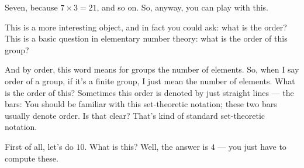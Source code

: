 \begin{speech}[00:08:44 - 00:09:45]
Seven, because $7 \times 3 = 21$, and so on. So, anyway, you can play with this.

This is a more interesting object, and in fact you could ask: what is the order? This is a basic question in elementary number theory: what is the order of this group? 

And by order, this word means for groups the number of elements.  So, when I say order of a group, if it's a finite group, I just mean the number of elements. What is the order of this? Sometimes this order is denoted by just straight lines --- the bars:  You should be familiar with this set-theoretic notation; these two bars usually denote order. Is that clear? That's kind of standard set-theoretic notation.

First of all, let's do $10$. What is this? Well, the answer is $4$ --- you just have to compute these. 
\end{speech}

